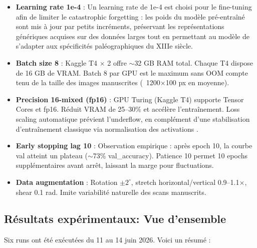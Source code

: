 ﻿\documentclass[twoside,twocolumn,10pt]{article}
\begin{document}
\begin{itemize}
  \item \textbf{Learning rate 1e-4} : Un learning rate de 1e-4 est choisi pour le fine-tuning afin de limiter le catastrophic forgetting : les poids du modèle pré-entraîné sont mis à jour par petits incréments, préservant les représentations génériques acquises sur des données larges tout en permettant au modèle de s'adapter aux spécificités paléographiques du XIIIe siècle.
  
  \item \textbf{Batch size 8} : Kaggle T4 $\times$ 2 offre $\sim$32 GB RAM total. Chaque T4 dispose de 16 GB de VRAM. Batch 8 par GPU est le maximum sans OOM compte tenu de la taille des images manuscrites (~1200×100 px en moyenne).
  
  \item \textbf{Precision 16-mixed (fp16)} \cite{fp16_training2018} : GPU Turing (Kaggle T4) supporte Tensor Cores et fp16. Réduit VRAM de 25--30\% et accélère l'entraînement. Loss scaling automatique prévient l'underflow, en complément d'une stabilisation d'entraînement classique via normalisation des activations \cite{batch_norm2015}.
  
  \item \textbf{Early stopping lag 10} : Observation empirique : après epoch 10, la courbe val atteint un plateau ($\sim$73\% val\_accuracy). Patience 10 permet 10 epochs supplémentaires avant arrêt, laissant la marge pour fluctuations.
  
  \item \textbf{Data augmentation} \cite{data_augmentation_images2021} : Rotation $\pm 2^{\circ}$, stretch horizontal/vertical 0.9--1.1×, shear 0.1 rad. Imite variabilité naturelle des scans manuscrits.
\end{itemize}

\subsection{Résultats expérimentaux: Vue d'ensemble}

Six runs ont été exécutées du 11 au 14 juin 2026. Voici un résumé :
\end{document}
